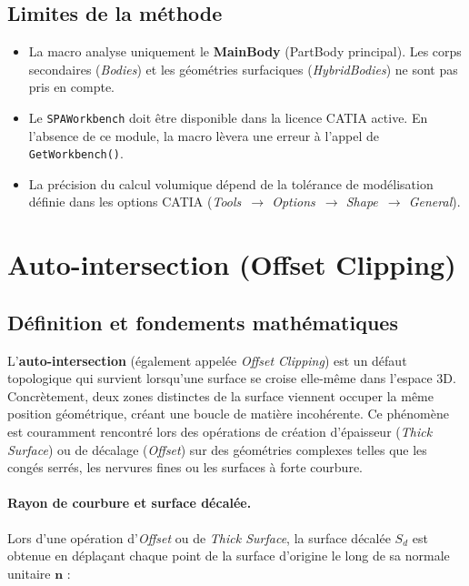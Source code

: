 \subsection{Limites de la méthode}

\begin{itemize}
    \item[•] La macro analyse uniquement le \textbf{MainBody} (PartBody principal). Les corps secondaires (\textit{Bodies}) et les géométries surfaciques (\textit{HybridBodies}) ne sont pas pris en compte.
    \item[•] Le \texttt{SPAWorkbench} doit être disponible dans la licence CATIA active. En l'absence de ce module, la macro lèvera une erreur à l'appel de \texttt{GetWorkbench()}.
    \item[•] La précision du calcul volumique dépend de la tolérance de modélisation définie dans les options CATIA (\textit{Tools~$\rightarrow$ Options~$\rightarrow$ Shape~$\rightarrow$ General}).
\end{itemize}

\section{Auto-intersection (Offset Clipping)}

\subsection{Définition et fondements mathématiques}

L'\textbf{auto-intersection} (également appelée \textit{Offset Clipping}) est un défaut topologique qui survient lorsqu'une surface se croise elle-même dans l'espace 3D. Concrètement, deux zones distinctes de la surface viennent occuper la même position géométrique, créant une boucle de matière incohérente. Ce phénomène est couramment rencontré lors des opérations de création d'épaisseur (\textit{Thick Surface}) ou de décalage (\textit{Offset}) sur des géométries complexes telles que les congés serrés, les nervures fines ou les surfaces à forte courbure.

\paragraph{Rayon de courbure et surface décalée.}
Lors d'une opération d'\textit{Offset} ou de \textit{Thick Surface}, la surface décalée $S_d$ est obtenue en déplaçant chaque point de la surface d'origine le long de sa normale unitaire $\mathbf{n}$ :

